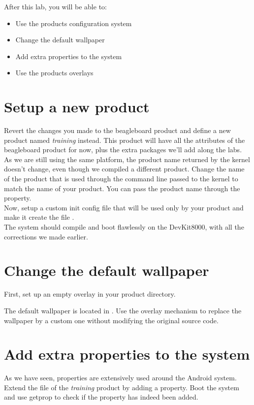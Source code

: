 
After this lab, you will be able to:
\begin{itemize}
  \item Use the products configuration system
  \item Change the default wallpaper
  \item Add extra properties to the system
  \item Use the products overlays
\end{itemize}

\section{Setup a new product}

Revert the changes you made to the beagleboard product and define a new product
named \textit{training} instead. This product will have all the attributes of
the beagleboard product for now, plus the extra packages we'll add along the
labs.\\

As we are still using the same platform, the product name returned by the
kernel doesn't change, even though we compiled a different product. Change
the name of the product that is used through the command line passed to the
kernel to match the name of your product. You can pass the product name through
the  property.\\

Now, setup a custom init config file that will be used only by your product and
make it create the file .\\

The system should compile and boot flawlessly on the DevKit8000, with all the
corrections we made earlier.

\section{Change the default wallpaper}

First, set up an empty overlay in your product directory.

The default wallpaper is located in .
Use the overlay mechanism to replace the wallpaper by a custom one without
modifying the original source code.

\section{Add extra properties to the system}

As we have seen, properties are extensively used around the Android system.
Extend the  file of the \textit{training} product by adding a
 property.
Boot the system and use getprop to check if the property has indeed been added.

